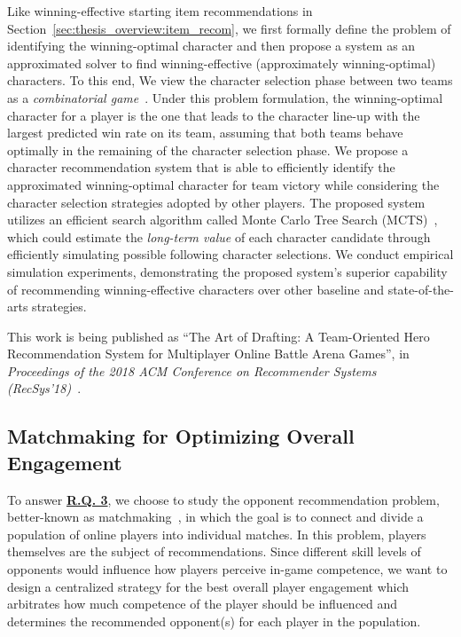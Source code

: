 Like winning-effective starting item recommendations in Section~\ref{sec:thesis_overview:item_recom}, we first formally define the problem of identifying the winning-optimal character and then propose a system as an approximated solver to find winning-effective (approximately winning-optimal) characters. To this end, We view the character selection phase between two teams as a \textit{combinatorial game}~\cite{browne2012survey}. Under this problem formulation, the winning-optimal character for a player is the one that leads to the character line-up with the largest predicted win rate on its team, assuming that both teams behave optimally in the remaining of the character selection phase.  We propose a character recommendation system that is able to efficiently identify the approximated winning-optimal character for team victory while considering the character selection strategies adopted by other players. The proposed system utilizes an efficient search algorithm called Monte Carlo Tree Search (MCTS)~\cite{kocsis2006bandit}, which could estimate the \textit{long-term value} of each character candidate through efficiently simulating possible following character selections. We conduct empirical simulation experiments, demonstrating the proposed system's superior capability of recommending winning-effective characters over other baseline and state-of-the-arts strategies. 

This work is being published as ``The Art of Drafting: A Team-Oriented Hero Recommendation System for Multiplayer Online Battle Arena Games'', in \textit{Proceedings of the 2018 ACM Conference on Recommender Systems (RecSys'18)}~\cite{chen2018draft}.



\subsection{Matchmaking for Optimizing Overall Engagement}\label{sec:thesis_overview:oppo_recom}

To answer \hyperref[rq3]{\textbf{R.Q. 3}}, we choose to study the opponent recommendation problem, better-known as matchmaking~\cite{medler2011using}, in which the goal is to connect and divide a population of online players into individual matches. In this problem, players themselves are the subject of recommendations. Since different skill levels of opponents would influence how players perceive in-game competence, we want to design a centralized strategy for the best overall player engagement which arbitrates how much competence of the player should be influenced and determines the recommended opponent(s) for each player in the population. 

